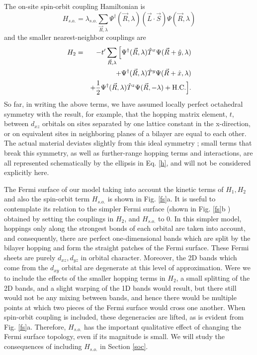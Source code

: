 \documentclass[prb,aps,amssymb,showpacs,twocolumn,amsmath,floatfix]{revtex4}
\def\ba{\begin{eqnarray}}
\def\ea{\end{eqnarray}}
\begin{document}
The on-site spin-orbit coupling Hamiltonian is 
\begin{equation}
\label{hso}
H_{s.o.} =  \lambda_{s.o.} \sum_{{\vec R}, \lambda} \Psi^{\dagger} ({\vec R}, \lambda) \left( \vec{L}  \cdot \vec{ S} \right) \Psi({\vec R}, \lambda) 
\end{equation}
and the smaller nearest-neighbor couplings are
\ba
H_2 &=&  -t' \sum_{{\vec R}, \lambda} \Big[\Psi^{\dagger} ( {\vec R} , \lambda) \hat{T}^x \Psi ({\vec R} + \hat{y}, \lambda) \nonumber \\
&& +\Psi^{\dagger} ( {\vec R} , \lambda) \hat{T}^y \Psi({\vec R} + \hat{x},\lambda)
\nonumber \\
&&+\frac{1}{2} \Psi^{\dagger}( {\vec R} , \lambda) \hat{T}^z \Psi ({\vec R}, -\lambda)  + {\rm H.C.} \Big ] .
\ea
So far, in writing the above terms, we have assumed locally perfect octahedral symmetry with the result, for example, that the hopping matrix element, $t$, between $d_{xz}$ orbitals on sites separated by one lattice constant in the x-direction, or on equivalent sites in neighboring planes of a bilayer are equal to each other.  
The actual material deviates slightly  from this ideal symmetry \cite{Shaked2000};
small terms that break this symmetry, as well as 
 further-range hopping terms and 
   interactions, are all represented schematically by the ellipsis 
  in Eq. \ref{h}, and will not be considered explicitly here.
 
 
 The Fermi surface of our model taking into account the kinetic terms of $H_{1}, H_{2}$ 
 and also the spin-orbit term $H_{s.o.}$ is shown in Fig. \ref{fs}a.  
  It is useful to contemplate its relation to the simpler
  Fermi surface (shown in 
 Fig. \ref{fs}b )  obtained by 
  setting the couplings in
  $H_2$, and $H_{s.o.}$ to 0.  
 In this simpler model, hoppings only along the 
  strongest bonds of each orbital are taken into account, and consequently, 
 there are perfect one-dimensional bands which are split by the 
 bilayer hopping and form the straight patches of the Fermi surface.  These Fermi sheets are 
 purely $d_{xz}, d_{yz}$ in orbital character.  
 Moreover, the
 2D bands  which come from the $d_{xy}$ orbital are degenerate at this level of approximation.  
 Were we to include the effects of the smaller hopping terms in $H_2$, a small splitting of the 2D bands, and a slight warping of the 1D bands would result, but there still would not  be any mixing between bands, and hence there would be multiple points at which two pieces of the Fermi surface 
 would cross one another.  When spin-orbit coupling is 
  included, 
 these degeneracies are lifted, as is evident from Fig. \ref{fs}a.  Therefore, $H_{s.o.} $ has the important qualitative effect of 
 changing the Fermi surface topology, even if its  
 magnitude is small.   We will study the consequences of 
 including $H_{s.o.}$ in Section \ref{soc}.  
 
\end{document}
